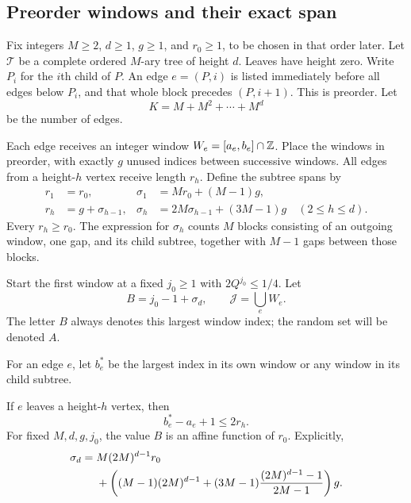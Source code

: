 \subsection{Preorder windows and their exact span}

Fix integers $M\ge2$, $d\ge1$, $g\ge1$, and $r_0\ge1$, to be chosen
in that order later. Let $\mathcal T$ be a complete ordered $M$-ary tree
of height $d$. Leaves have height zero. Write $P_i$ for the $i$th child
of $P$. An edge $e=(P,i)$ is listed immediately before all edges below
$P_i$, and that whole block precedes $(P,i+1)$. This is preorder.
Let
\begin{equation}\label{eq:Kedges}
 K=M+M^2+\cdots+M^d
\end{equation}
be the number of edges.

Each edge receives an integer window $W_e=[a_e,b_e]\cap\mathbb Z$.
Place the windows in preorder, with exactly $g$ unused indices between
successive windows. All edges from a height-$h$ vertex receive length
$r_h$. Define the subtree spans by
\begin{align}
 r_1&=r_0,& \sigma_1&=Mr_0+(M-1)g,\label{eq:window-recursion1}\\
 r_h&=g+\sigma_{h-1},&
 \sigma_h&=2M\sigma_{h-1}+(3M-1)g\quad(2\le h\le d).
 \label{eq:window-recursion2}
\end{align}
Every $r_h\ge r_0$. The expression for $\sigma_h$ counts $M$ blocks
consisting of an outgoing window, one gap, and its child subtree, together
with $M-1$ gaps between those blocks.

Start the first window at a fixed $j_0\ge1$ with $2Q^{j_0}\le1/4$.
Let
\begin{equation}\label{eq:B-global}
 B=j_0-1+\sigma_d,\qquad \mathcal J=\bigcup_e W_e.
\end{equation}
The letter $B$ always denotes this largest window index; the random set
will be denoted $A$.

For an edge $e$, let $b_e^*$ be the largest index in its own window or
any window in its child subtree.

\begin{lemma}\label{lem:span}
If $e$ leaves a height-$h$ vertex, then
\begin{equation}\label{eq:span}
 b_e^*-a_e+1\le2r_h.
\end{equation}
For fixed $M,d,g,j_0$, the value $B$ is an affine function of $r_0$.
Explicitly,
\begin{align}
 \sigma_d={}&M(2M)^{d-1}r_0\notag\\
 &+\left((M-1)(2M)^{d-1}
 +(3M-1)\frac{(2M)^{d-1}-1}{2M-1}\right)g.
 \label{eq:affine-span}
\end{align}
\end{lemma}

